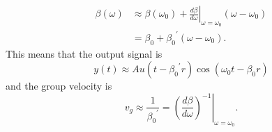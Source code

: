 \documentclass{article}
\begin{document}
\begin{equation}
	\begin{split}
		\beta(\omega)&\approx\beta(\omega_0)+\left.\frac{d\beta}{d\omega}\right|_{\omega=\omega_0}(\omega-\omega_0)\\
		&=\beta_0+{\beta_0}^\prime(\omega-\omega_0).
	\end{split}
\end{equation}
This means that the output signal is
\begin{equation}
	y(t)\approx{Au(t-{\beta_0}^\prime{r})\cos{(\omega_0t-\beta_0r)}}
\end{equation}
and the group velocity is
\begin{equation}
	v_g\approx\frac{1}{{\beta_0}^\prime}=\left.\left(\frac{d\beta}{d\omega}\right)^{-1}\right|_{\omega=\omega_0}.
\end{equation}
\end{document}
